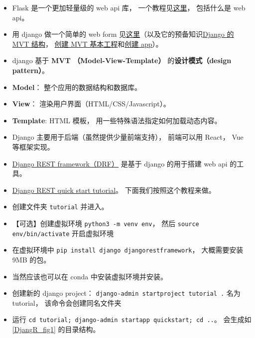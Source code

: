 

\begin{issues}
\issueDraft
\end{issues}

\begin{itemize}
\item Flask 是一个更加轻量级的 web api 库， 一个教程见\href{https://programminghistorian.org/en/lessons/creating-apis-with-python-and-flask}{这里}， 包括什么是 web api。
\item 用 django 做一个简单的 web form 见\href{https://www.geeksforgeeks.org/how-to-create-a-form-using-django-forms/}{这里}（以及它的预备知识\href{https://www.geeksforgeeks.org/django-project-mvt-structure}{Django 的 MVT 结构}， \href{https://www.geeksforgeeks.org/how-to-create-a-basic-project-using-mvt-in-django/}{创建 MVT 基本工程}和\href{https://www.geeksforgeeks.org/how-to-create-an-app-in-django/}{创建 app}）。
\item django 基于 \textbf{MVT （Model-View-Template）} 的\textbf{设计模式（design pattern）}。
\item \textbf{Model}： 整个应用的数据结构和数据库。
\item \textbf{View}： 渲染用户界面（HTML/CSS/Javascript）。
\item \textbf{Template}: HTML 模板， 用一些特殊语法指定如何加载动态内容。
\item Django 主要用于后端（虽然提供少量前端支持）， 前端可以用 React， Vue 等框架实现。
\item \href{https://www.django-rest-framework.org/}{Django REST framework（DRF）} 是基于 django 的用于搭建 web api 的工具。
\item \href{https://www.django-rest-framework.org/tutorial/quickstart/}{Django REST quick start tutorial}。 下面我们按照这个教程来做。
\item 创建文件夹 \verb|tutorial| 并进入。
\item 【可选】创建虚拟环境 \verb|python3 -m venv env|， 然后 \verb|source env/bin/activate| 开启虚拟环境
\item 在虚拟环境中 \verb|pip install django djangorestframework|， 大概需要安装 9MB 的包。
\item 当然应该也可以在 conda 中安装虚拟环境并安装。
\item 创建新的 django project： \verb|django-admin startproject tutorial .| 名为 tutorial， 该命令会创建同名文件夹
\item 运行 \verb|cd tutorial; django-admin startapp quickstart; cd ..|。 会生成如\autoref{DjangR_fig1} 的目录结构。

\end{itemize}
